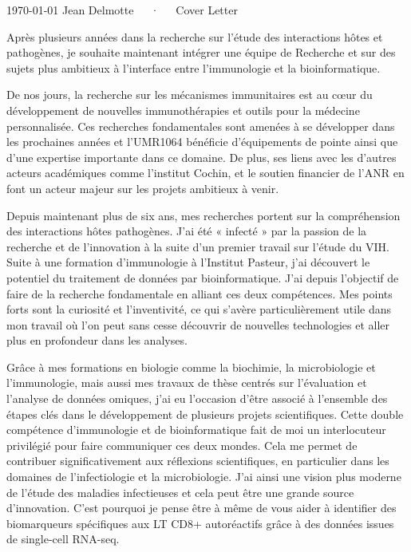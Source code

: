 \documentclass[11pt, a4paper]{awesome-cv}
\begin{document}
\makecvheader[R]

\makecvfooter
  {\today}
  {Jean Delmotte~~~·~~~Cover Letter}
  {\thepage}
\makelettertitle

\begin{cvletter}

Après plusieurs années dans la recherche sur l’étude des interactions hôtes et pathogènes, je souhaite maintenant intégrer une équipe de Recherche et sur des sujets plus ambitieux à l’interface entre l’immunologie et la bioinformatique.

De nos jours, la recherche sur les mécanismes immunitaires est au cœur du développement de nouvelles immunothérapies et outils pour la médecine personnalisée. Ces recherches fondamentales sont amenées à se développer dans les prochaines années et l’UMR1064 bénéficie d’équipements de pointe ainsi que d’une expertise importante dans ce domaine. De plus, ses liens avec les d'autres acteurs académiques comme l’institut Cochin, et le soutien financier de l'ANR en font un acteur majeur sur les projets ambitieux à venir.

Depuis maintenant plus de six ans, mes recherches portent sur la compréhension des interactions hôtes pathogènes. J'ai été « infecté » par la passion de la recherche et de l'innovation à la suite d’un premier travail sur l'étude du VIH. Suite à une formation d'immunologie à l’Institut Pasteur, j’ai découvert le potentiel du traitement de données par bioinformatique. J’ai depuis l'objectif de faire de la recherche fondamentale en alliant ces deux compétences. Mes points forts sont la curiosité et l'inventivité, ce qui s'avère particulièrement utile dans mon travail où l'on peut sans cesse découvrir de nouvelles technologies et aller plus en profondeur dans les analyses.

Grâce à mes formations en biologie comme la biochimie, la microbiologie et l’immunologie, mais aussi mes travaux de thèse centrés sur l’évaluation et l’analyse de données omiques, j’ai eu l’occasion d’être associé à l'ensemble des étapes clés dans le développement de plusieurs projets scientifiques. Cette double compétence d'immunologie et de bioinformatique fait de moi un interlocuteur privilégié pour faire communiquer ces deux mondes. Cela me permet de contribuer significativement aux réflexions scientifiques, en particulier dans les domaines de l’infectiologie et la microbiologie. J'ai ainsi une vision plus moderne de l’étude des maladies infectieuses et cela peut être une grande source d’innovation. C'est pourquoi je pense être à même de vous aider à identifier des biomarqueurs spécifiques aux LT CD8+ autoréactifs grâce à des données issues de single-cell RNA-seq.


\end{cvletter}
\end{document}
